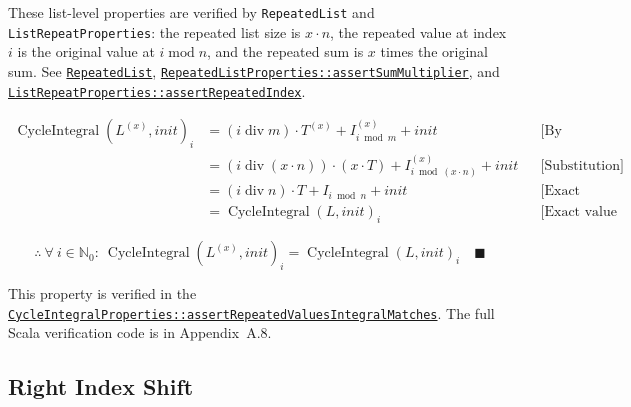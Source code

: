 {\raggedright
These list-level properties are verified by \texttt{RepeatedList} and
\texttt{ListRepeatProperties}: the repeated list size is $x \cdot n$, the
repeated value at index $i$ is the original value at
$i \operatorname{mod} n$, and the repeated sum is $x$ times the original
sum. See
\href{https://github.com/thiagomata/prime-numbers/blob/integral-cycle-article-v1.0.0/src/main/scala/v1/chapter3/list/RepeatedList.scala}{\texttt{RepeatedList}},
\href{https://github.com/thiagomata/prime-numbers/blob/integral-cycle-article-v1.0.0/src/main/scala/v1/chapter3/list/properties/RepeatedListProperties.scala}{\texttt{RepeatedListProperties::\allowbreak assertSumMultiplier}},
and
\href{https://github.com/thiagomata/prime-numbers/blob/integral-cycle-article-v1.0.0/src/main/scala/v1/chapter3/list/properties/ListRepeatProperties.scala}{\texttt{ListRepeatProperties::\allowbreak assertRepeatedIndex}}.
\par}

\begin{equation*}
\begin{aligned}
\operatorname{CycleIntegral}(L^{(x)}, init)_i
&= (i \operatorname{div} m)\cdot T^{(x)} + I^{(x)}_{i \bmod m} + init
  &&\text{[By Definition]} \\
&= (i \operatorname{div} (x \cdot n))\cdot (x \cdot T) + I^{(x)}_{i \bmod (x \cdot n)} + init
  &&\text{[Substitution]} \\
&= (i \operatorname{div} n)\cdot T + I_{i \bmod n} + init
  &&\text{[Exact simplification]} \\
&= \operatorname{CycleIntegral}(L, init)_i
  &&\text{[Exact value reproduction]}
\end{aligned}
\end{equation*}

\begin{equation*}
\therefore \ \forall \ i \in \mathbb{N}_0: \ \operatorname{CycleIntegral}(L^{(x)}, init)_i = \operatorname{CycleIntegral}(L, init)_i \quad \blacksquare
\end{equation*}

{\raggedright
This property is verified in the
\href{https://github.com/thiagomata/prime-numbers/blob/integral-cycle-article-v1.0.0/src/main/scala/v1/chapter4/cycle/integral/recursive/properties/CycleIntegralProperties.scala}{\texttt{CycleIntegralProperties::\allowbreak assertRepeatedValuesIntegralMatches}}.
The full Scala verification code is in Appendix~A.8.
\par}

\subsection{Right Index Shift}

